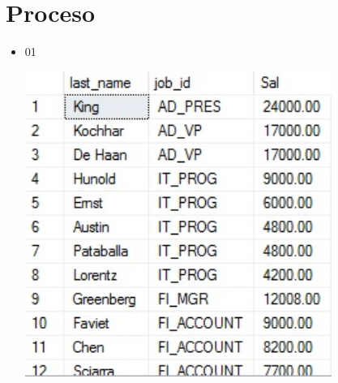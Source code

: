 \section{Proceso} 

\begin{itemize}
	\item 01
	\begin{center}
	\includegraphics[width=10cm]{./Imagenes/ac} 
	\end{center}
\end{itemize} 
